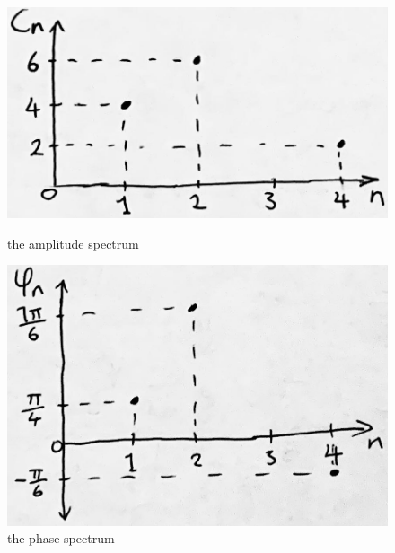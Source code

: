 \documentclass[12pt]{article}
\begin{document}
\begin{figure}[!h]
    \begin{minipage}[c]{0.47\linewidth}
        \centering
        \includegraphics[width=1\linewidth]{fourier_series_single_side_spectrum_example1}
        \caption{the amplitude spectrum}
        \label{fig:fourier_series_single_side_spectrum_example1}
    \end{minipage}\hfill
    \begin{minipage}[c]{0.47\linewidth}
        \centering
        \includegraphics[width=1\linewidth]{fourier_series_single_side_spectrum_example2}
        \caption{the phase spectrum}
        \label{fig:fourier_series_single_side_spectrum_example2}
    \end{minipage}
\end{figure}


\end{document}
